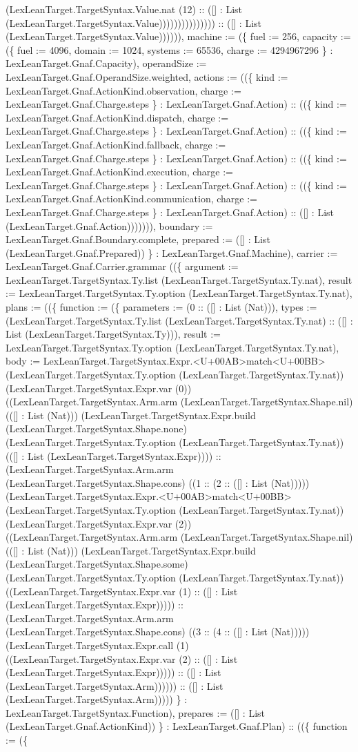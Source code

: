 \documentclass[11pt]{article}
\begin{document}
(LexLeanTarget.TargetSyntax.Value.nat (12) :: ([] : List (LexLeanTarget.TargetSyntax.Value))))))))))))))) :: ([] : List (LexLeanTarget.TargetSyntax.Value)))))), machine := (\{ fuel := 256, capacity := (\{ fuel := 4096, domain := 1024, systems := 65536, charge := 4294967296 \} : LexLeanTarget.Gnaf.Capacity), operandSize := LexLeanTarget.Gnaf.OperandSize.weighted, actions := ((\{ kind := LexLeanTarget.Gnaf.ActionKind.observation, charge := LexLeanTarget.Gnaf.Charge.steps \} : LexLeanTarget.Gnaf.Action) :: ((\{ kind := LexLeanTarget.Gnaf.ActionKind.dispatch, charge := LexLeanTarget.Gnaf.Charge.steps \} : LexLeanTarget.Gnaf.Action) :: ((\{ kind := LexLeanTarget.Gnaf.ActionKind.fallback, charge := LexLeanTarget.Gnaf.Charge.steps \} : LexLeanTarget.Gnaf.Action) :: ((\{ kind := LexLeanTarget.Gnaf.ActionKind.execution, charge := LexLeanTarget.Gnaf.Charge.steps \} : LexLeanTarget.Gnaf.Action) :: ((\{ kind := LexLeanTarget.Gnaf.ActionKind.communication, charge := LexLeanTarget.Gnaf.Charge.steps \} : LexLeanTarget.Gnaf.Action) :: ([] : List (LexLeanTarget.Gnaf.Action))))))), boundary := LexLeanTarget.Gnaf.Boundary.complete, prepared := ([] : List (LexLeanTarget.Gnaf.Prepared)) \} : LexLeanTarget.Gnaf.Machine), carrier := LexLeanTarget.Gnaf.Carrier.grammar ((\{ argument := LexLeanTarget.TargetSyntax.Ty.list (LexLeanTarget.TargetSyntax.Ty.nat), result := LexLeanTarget.TargetSyntax.Ty.option (LexLeanTarget.TargetSyntax.Ty.nat), plans := ((\{ function := (\{ parameters := (0 :: ([] : List (Nat))), types := (LexLeanTarget.TargetSyntax.Ty.list (LexLeanTarget.TargetSyntax.Ty.nat) :: ([] : List (LexLeanTarget.TargetSyntax.Ty))), result := LexLeanTarget.TargetSyntax.Ty.option (LexLeanTarget.TargetSyntax.Ty.nat), body := LexLeanTarget.TargetSyntax.Expr.<U+00AB>match<U+00BB> (LexLeanTarget.TargetSyntax.Ty.option (LexLeanTarget.TargetSyntax.Ty.nat)) (LexLeanTarget.TargetSyntax.Expr.var (0)) ((LexLeanTarget.TargetSyntax.Arm.arm (LexLeanTarget.TargetSyntax.Shape.nil) (([] : List (Nat))) (LexLeanTarget.TargetSyntax.Expr.build (LexLeanTarget.TargetSyntax.Shape.none) (LexLeanTarget.TargetSyntax.Ty.option (LexLeanTarget.TargetSyntax.Ty.nat)) (([] : List (LexLeanTarget.TargetSyntax.Expr)))) :: (LexLeanTarget.TargetSyntax.Arm.arm (LexLeanTarget.TargetSyntax.Shape.cons) ((1 :: (2 :: ([] : List (Nat))))) (LexLeanTarget.TargetSyntax.Expr.<U+00AB>match<U+00BB> (LexLeanTarget.TargetSyntax.Ty.option (LexLeanTarget.TargetSyntax.Ty.nat)) (LexLeanTarget.TargetSyntax.Expr.var (2)) ((LexLeanTarget.TargetSyntax.Arm.arm (LexLeanTarget.TargetSyntax.Shape.nil) (([] : List (Nat))) (LexLeanTarget.TargetSyntax.Expr.build (LexLeanTarget.TargetSyntax.Shape.some) (LexLeanTarget.TargetSyntax.Ty.option (LexLeanTarget.TargetSyntax.Ty.nat)) ((LexLeanTarget.TargetSyntax.Expr.var (1) :: ([] : List (LexLeanTarget.TargetSyntax.Expr))))) :: (LexLeanTarget.TargetSyntax.Arm.arm (LexLeanTarget.TargetSyntax.Shape.cons) ((3 :: (4 :: ([] : List (Nat))))) (LexLeanTarget.TargetSyntax.Expr.call (1) ((LexLeanTarget.TargetSyntax.Expr.var (2) :: ([] : List (LexLeanTarget.TargetSyntax.Expr))))) :: ([] : List (LexLeanTarget.TargetSyntax.Arm)))))) :: ([] : List (LexLeanTarget.TargetSyntax.Arm))))) \} : LexLeanTarget.TargetSyntax.Function), prepares := ([] : List (LexLeanTarget.Gnaf.ActionKind)) \} : LexLeanTarget.Gnaf.Plan) :: ((\{ function := (\{ 
\end{document}
